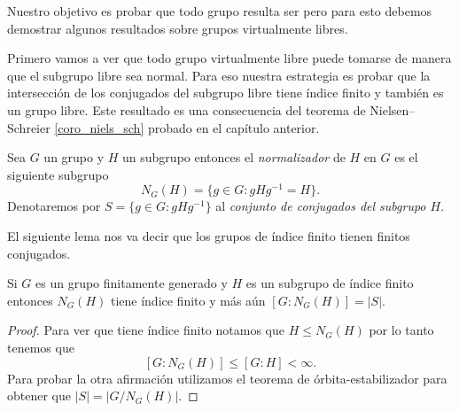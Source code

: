\documentclass[tesis.tex]{subfiles}
\begin{document}
Nuestro objetivo es probar que todo grupo \vl resulta ser \ic pero para esto debemos  demostrar algunos resultados sobre grupos virtualmente libres.

Primero vamos a ver que todo grupo virtualmente libre puede tomarse de manera que el subgrupo libre sea normal.
Para eso nuestra estrategia es probar que la intersección de los conjugados del subgrupo libre tiene índice finito y también es un grupo libre.
Este resultado es una consecuencia del teorema de Nielsen--Schreier \ref{coro_niels_sch} probado en el capítulo anterior.


\begin{deff}
	Sea $G$ un grupo y $H$ un subgrupo entonces el \emph{normalizador} de $H$ en $G$ es el siguiente subgrupo
	\begin{equation*}
		N_G(H) = \{ g\in G : gHg^{-1} = H  \}.
	\end{equation*}
	Denotaremos por $S= \{ g \in G :  gHg^{-1} \}$ al \emph{conjunto de conjugados del subgrupo $H$}.

\end{deff}

 

El siguiente lema nos va decir que los grupos de índice finito tienen finitos conjugados.

\begin{lema}\label{lema_normalizador_conjugados}
	Si $G$ es un grupo finitamente generado y $H$ es un subgrupo de índice finito entonces $N_G(H)$ tiene índice finito y más aún $[G:N_G(H)] = |S|$.
\end{lema}
\begin{proof}
	Para ver que tiene índice finito notamos que $H \le N_G(H)$ por lo tanto tenemos que 
	\[
		[G:N_G(H)] \le [G:H] < \infty.
		\]
	Para probar la otra afirmación utilizamos el teorema de órbita-estabilizador para obtener que $|S| = |G/N_{G}(H)|$.
\end{proof}
\end{document}

